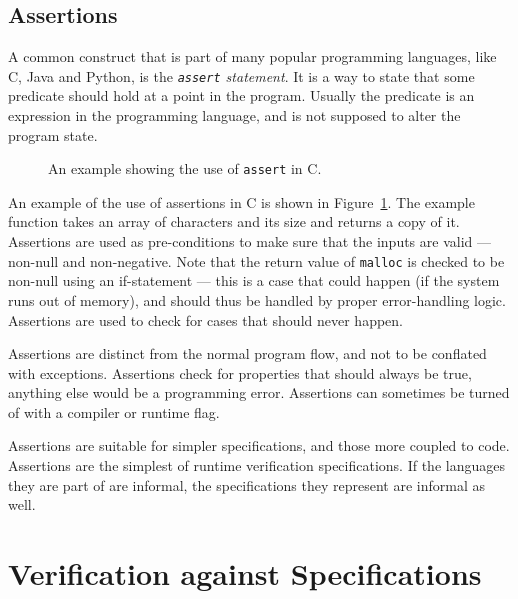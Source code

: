 \subsection{Assertions}

A common construct that is part of many popular programming languages, like C,
Java and Python, is the \textit{\texttt{assert} statement}. It is a way to
state that some predicate should hold at a point in the program. Usually the
predicate is an expression in the programming language, and is not supposed to
alter the program state.

\begin{figure}[h!]
	\begin{center}
	\begin{minipage}{0.7\textwidth}
    \lstset{language=C}
		
	\end{minipage}
	\end{center}
  \caption{An example showing the use of \texttt{assert} in C.}
	\label{figure-c-assert-example}
\end{figure}

An example of the use of assertions in C is shown in
Figure~\ref{figure-c-assert-example}. The example function takes an array of
characters and its size and returns a copy of it. Assertions are used as
pre-conditions to make sure that the inputs are valid --- non-null and
non-negative. Note that the return value of \texttt{malloc} is checked to be
non-null using an if-statement --- this is a case that could happen (if the
system runs out of memory), and should thus be handled by proper error-handling
logic. Assertions are used to check for cases that should never happen.

Assertions are distinct from the normal program flow, and not to be conflated
with exceptions. Assertions check for properties that should always be true,
anything else would be a programming error. Assertions can sometimes be turned
of with a compiler or runtime flag.

Assertions are suitable for simpler specifications, and those more coupled to
code. Assertions are the simplest of runtime verification specifications. If
the languages they are part of are informal, the specifications they represent
are informal as well.



\section{Verification against Specifications} \label{section-verification}

